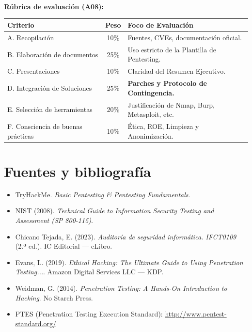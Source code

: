 \documentclass[11pt,a4paper]{article}
\begin{document}
\textbf{Rúbrica de evaluación (A08):}
\begin{center}
\renewcommand{\arraystretch}{1.2}
\begin{tabularx}{\textwidth}{@{} l c X @{}}
\toprule
\textbf{Criterio} & \textbf{Peso} & \textbf{Foco de Evaluación} \\
\midrule
A. Recopilación & 10\% & Fuentes, CVEs, documentación oficial. \\
B. Elaboración de documentos & 25\% & Uso estricto de la Plantilla de Pentesting. \\
C. Presentaciones & 10\% & Claridad del Resumen Ejecutivo. \\
D. Integración de Soluciones & 25\% & \textbf{Parches y Protocolo de Contingencia.} \\
E. Selección de herramientas & 20\% & Justificación de Nmap, Burp, Metasploit, etc. \\
F. Consciencia de buenas prácticas & 10\% & Ética, ROE, Limpieza y Anonimización. \\
\bottomrule
\end{tabularx}
\end{center}

\section{Fuentes y bibliografía}

\begin{itemize}[leftmargin=*]
  \item TryHackMe. \textit{Basic Pentesting \& Pentesting Fundamentals}.
  \item NIST (2008). \textit{Technical Guide to Information Security Testing and Assessment (SP 800-115)}.
  \item Chicano Tejada, E. (2023). \textit{Auditoría de seguridad informática. IFCT0109} (2.ª ed.). IC Editorial --- eLibro.
  \item Evans, L. (2019). \textit{Ethical Hacking: The Ultimate Guide to Using Penetration Testing...}. Amazon Digital Services LLC --- KDP.
  \item Weidman, G. (2014). \textit{Penetration Testing: A Hands-On Introduction to Hacking}. No Starch Press.
  \item PTES (Penetration Testing Execution Standard): \url{http://www.pentest-standard.org/}
\end{itemize}
\end{document}

